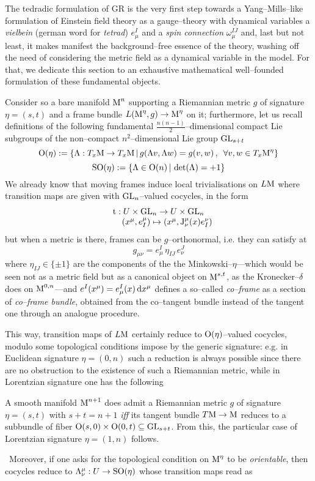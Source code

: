 The tedradic formulation of GR is the very first step towards a Yang--Mills--like formulation of Einstein field theory as a gauge--theory with dynamical variables a \emph{vielbein} (german word for \emph{tetrad}) $e^I_\mu$ and a \emph{spin connection} $\omega^{IJ}_\mu$ and, last but not least, it makes manifest the background--free essence of the theory, washing off the need of considering the metric field as a dynamical variable in the model. For that, we dedicate this section to an exhaustive mathematical well--founded formulation of these fundamental objects.

Consider so a bare manifold $\text{\normalfont M}^n$ supporting a Riemannian metric $g$ of signature $\eta=(s,t)$ and a frame bundle $L(\text{\normalfont M}^\eta,g)\to\text{\normalfont M}^\eta$ on it; furthermore, let us recall definitions
of the following fundamental $\frac{n(n-1)}{2}$--dimensional compact Lie subgroups of the non--compact $n^2$--dimensional Lie group $\text{\normalfont GL}_{s+t}$
$$\text{\normalfont O}(\eta):=\{\Lambda:T_x\text{\normalfont M}\to T_x\text{\normalfont M}\,|\,g(\Lambda v,\Lambda w)=g(v,w)\,,\,\,\,\forall v,w\in T_x\text{\normalfont M}^\eta\}$$
$$\text{\normalfont SO}(\eta):=\{\Lambda\in\text{\normalfont O}(n)\,|\, \det(\Lambda)=+1\}$$
We already know that moving frames induce local trivialisations on $L\text{\normalfont M}$ where transition maps are given with $\text{\normalfont GL}_n$--valued cocycles, in the form
$$\begin{matrix}
    \text{\normalfont t}:U\times\text{\normalfont GL}_n\to U\times\text{\normalfont GL}_n\\
    \qquad (x^\mu,e_I^\mu)\mapsto(x^\mu,\text{\normalfont J}^\mu_\nu(x)e_I^\nu)
\end{matrix}$$
but when a metric is there, frames can be $g$--orthonormal, i.e. they can satisfy at
$$g_{\mu\nu}=e^I_\mu\,\eta_{IJ}\,e^J_\nu$$
where $\eta_{IJ}\in\{\pm1\}$ are the components of the the Minkowski--$\eta$---which would be seen not as a metric field but as a canonical object on $\text{\normalfont M}^{s,t}$, as the Kronecker--$\delta$ does on $\text{\normalfont M}^{0,n}$---and $e^I(x^\mu)=e^I_\mu(x)\,\text{\normalfont d} x^\mu$ defines a so--called \emph{co--frame} as a section of \emph{co--frame bundle}, obtained from the co--tangent bundle instead of the tangent one through an analogue procedure.

This way, transition maps of $L\text{\normalfont M}$ certainly reduce to $\text{\normalfont O}(\eta)$--valued cocycles, modulo some topological conditions impose by the generic signature: e.g. in Euclidean signature $\eta=(0,n)$ such a reduction is always possible since there are no obstruction to the existence of such a Riemannian metric, while in Lorentzian signature one has the following

\begin{remark}
    A smooth manifold $\text{\normalfont M}^{n+1}$ does admit a Riemannian metric $g$ of signature $\eta=(s,t)$ with $s+t=n+1$ \emph{iff} its tangent bundle $T\text{\normalfont M}\to\text{\normalfont M}$ reduces to a subbundle of fiber $\text{\normalfont O}(s,0)\times\text{\normalfont O}(0,t)\subseteq\text{\normalfont GL}_{s+t}$. From this, the particular case of Lorentzian signature $\eta=(1,n)$ follows.
\end{remark}
\,\newline
Moreover, if one asks for the topological condition on $\text{\normalfont M}^\eta$ to be \emph{orientable}, then cocycles reduce to $\Lambda^\mu_\nu:U\to\text{\normalfont SO}(\eta)$ whose transition maps read as

